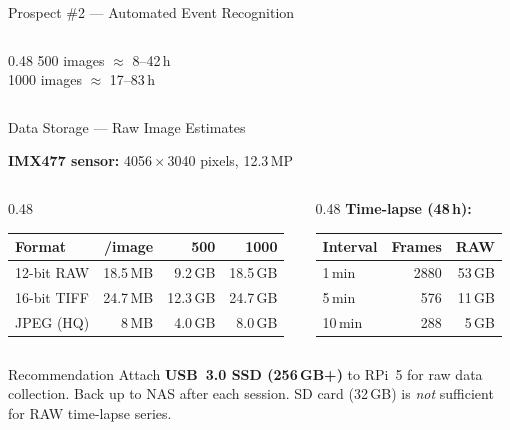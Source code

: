 \documentclass[aspectratio=169,11pt]{beamer}
\begin{document}
\begin{frame}{Prospect \#2 --- Automated Event Recognition}
\begin{columns}[T]
\begin{column}{0.48\textwidth}
      \vspace{0.3em}
      500 images $\approx$ 8--42\,h\\
      1000 images $\approx$ 17--83\,h
    \end{column}
  \end{columns}

\end{frame}

\begin{frame}{Data Storage --- Raw Image Estimates}

  \textbf{IMX477 sensor:} 4056\,$\times$\,3040 pixels, 12.3\,MP

  \vspace{0.5em}

  \begin{columns}[T]
    \begin{column}{0.48\textwidth}
      \begin{tabular}{@{}lrrr@{}}
        \toprule
        \textbf{Format} & \textbf{/image} & \textbf{500} & \textbf{1000} \\
        \midrule
        12-bit RAW  & 18.5\,MB & 9.2\,GB  & 18.5\,GB \\
        16-bit TIFF & 24.7\,MB & 12.3\,GB & 24.7\,GB \\
        JPEG (HQ)   & 8\,MB    & 4.0\,GB  & 8.0\,GB \\
        \bottomrule
      \end{tabular}
    \end{column}
    \begin{column}{0.48\textwidth}
      \textbf{Time-lapse (48\,h):}

      \begin{tabular}{@{}lrr@{}}
        \toprule
        \textbf{Interval} & \textbf{Frames} & \textbf{RAW} \\
        \midrule
        1\,min  & 2880 & 53\,GB \\
        5\,min  & 576  & 11\,GB \\
        10\,min & 288  & 5\,GB \\
        \bottomrule
      \end{tabular}
    \end{column}
  \end{columns}

  \vfill

  \begin{block}{Recommendation}
    Attach \textbf{USB~3.0 SSD (256\,GB+)} to RPi~5 for raw data collection.
    Back up to NAS after each session.
    SD card (32\,GB) is \emph{not} sufficient for RAW time-lapse series.
  \end{block}

\end{frame}
\end{document}
